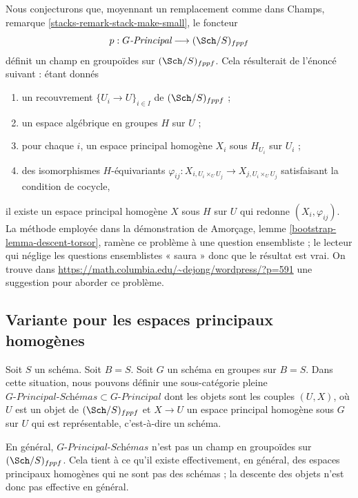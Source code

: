 \begin{remark}
\label{remark-principal-stack-in-groupoids}
Nous conjecturons que, moyennant un remplacement comme dans
Champs, remarque \ref{stacks-remark-stack-make-small},
le foncteur
$$
p : G\textit{-Principal} \longrightarrow (\Sch/S)_{fppf}
$$
définit un champ en groupoïdes sur $(\Sch/S)_{fppf}$. Cela résulterait
de l'énoncé suivant : étant donnés
\begin{enumerate}
\item un recouvrement $\{U_i \to U\}_{i \in I}$ de $(\Sch/S)_{fppf}$ ;
\item un espace algébrique en groupes $H$ sur $U$ ;
\item pour chaque $i$, un espace principal homogène $X_i$ sous $H_{U_i}$
sur $U_i$ ;
\item des isomorphismes $H$-équivariants
$\varphi_{ij} : X_{i, U_i \times_U U_j} \to X_{j, U_i \times_U U_j}$
satisfaisant la condition de cocycle,
\end{enumerate}
il existe un espace principal homogène $X$ sous $H$ sur $U$
qui redonne $(X_i, \varphi_{ij})$. La méthode employée dans la démonstration de
Amorçage, lemme \ref{bootstrap-lemma-descent-torsor},
ramène ce problème à une question ensembliste ; le lecteur qui néglige
les questions ensemblistes « saura » donc que le résultat est vrai. On trouve dans
\url{https://math.columbia.edu/~dejong/wordpress/?p=591}
une suggestion pour aborder ce problème.
\end{remark}



\subsection{Variante pour les espaces principaux homogènes}
\label{subsection-variant-principal-homogeneous-spaces}

\noindent
Soit $S$ un schéma. Soit $B = S$.
Soit $G$ un schéma en groupes sur $B = S$.
Dans cette situation, nous pouvons définir une sous-catégorie pleine
$G\textit{-Principal-Schémas} \subset G\textit{-Principal}$
dont les objets sont les couples $(U, X)$, où $U$ est un objet de
$(\Sch/S)_{fppf}$ et $X \to U$ un espace principal homogène
sous $G$ sur $U$ qui est représentable, c'est-à-dire un schéma.

\medskip\noindent
En général, $G\textit{-Principal-Schémas}$ n'est pas
un champ en groupoïdes sur $(\Sch/S)_{fppf}$. Cela tient
à ce qu'il existe effectivement, en général, des espaces principaux homogènes
qui ne sont pas des schémas ; la descente des objets n'est donc pas effective
en général.



